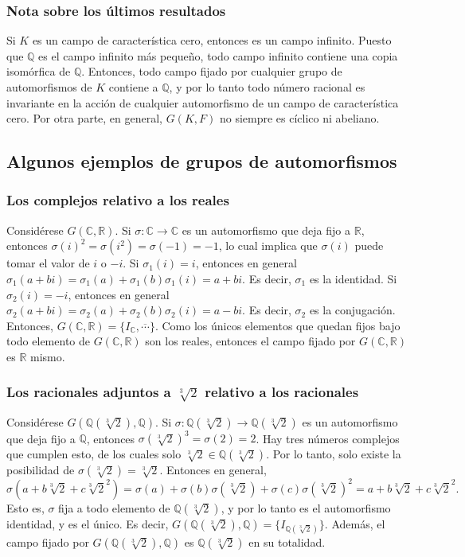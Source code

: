 \documentclass{article}
\begin{document}
\subsubsection*{\color{teal} Nota sobre los últimos resultados}

Si $K$ es un campo de característica cero, entonces es un campo infinito. Puesto que $\mathbb{Q}$ es el campo infinito más pequeño, todo campo infinito contiene una copia isomórfica de $\mathbb{Q}$. Entonces, todo campo fijado por cualquier grupo de automorfismos de $K$ contiene a $\mathbb{Q}$, y por lo tanto todo número racional es invariante en la acción de cualquier automorfismo de un campo de característica cero. Por otra parte, en general, $G(K,F)$ no siempre es cíclico ni abeliano. 

\subsection*{\color{teal} Algunos ejemplos de grupos de automorfismos}

\subsubsection*{\color{teal} Los complejos relativo a los reales}

Considérese $G(\mathbb{C},\mathbb{R})$. Si $\sigma:\mathbb{C}\to\mathbb{C}$ es un automorfismo que deja fijo a $\mathbb{R}$, entonces $\sigma(i)^2=\sigma(i^2)=\sigma(-1)=-1$, lo cual implica que $\sigma(i)$ puede tomar el valor de $i$ o $-i$. Si $\sigma_1(i)=i$, entonces en general $\sigma_1(a+bi)=\sigma_1(a)+\sigma_1(b)\sigma_1(i)=a+bi$. Es decir, $\sigma_1$ es la identidad. Si $\sigma_2(i)=-i$, entonces en general $\sigma_2(a+bi)=\sigma_2(a)+\sigma_2(b)\sigma_2(i)=a-bi$. Es decir, $\sigma_2$ es la conjugación. Entonces, $G(\mathbb{C},\mathbb{R})=\{I_{\mathbb{C}},\overline{\cdots}\}$. Como los únicos elementos que quedan fijos bajo todo elemento de $G(\mathbb{C},\mathbb{R})$ son los reales, entonces el campo fijado por $G(\mathbb{C},\mathbb{R})$ es $\mathbb{R}$ mismo.

\subsubsection*{\color{teal} Los racionales adjuntos a $\sqrt[3]{2}$ relativo a los racionales}

Considérese $G(\mathbb{Q}(\sqrt[3]{2}),\mathbb{Q})$. Si $\sigma:\mathbb{Q}(\sqrt[3]{2})\to\mathbb{Q}(\sqrt[3]{2})$ es un automorfismo que deja fijo a $\mathbb{Q}$, entonces $\sigma(\sqrt[3]{2})^3=\sigma(2)=2$. Hay tres números complejos que cumplen esto, de los cuales solo $\sqrt[3]{2}\in\mathbb{Q}(\sqrt[3]{2})$. Por lo tanto, solo existe la posibilidad de $\sigma(\sqrt[3]{2})=\sqrt[3]{2}$. Entonces en general, 
$$\sigma(a+b\sqrt[3]{2}+c\sqrt[3]{2}^2)=\sigma(a)+\sigma(b)\sigma(\sqrt[3]{2})+\sigma(c)\sigma(\sqrt[3]{2})^2=a+b\sqrt[3]{2}+c\sqrt[3]{2}^2.$$
Esto es, $\sigma$ fija a todo elemento de $\mathbb{Q}(\sqrt[3]{2})$, y por lo tanto es el automorfismo identidad, y es el único. Es decir, $G(\mathbb{Q}(\sqrt[3]{2}),\mathbb{Q})=\{I_{\mathbb{Q}(\sqrt[3]{2})}\}$. Además, el campo fijado por $G(\mathbb{Q}(\sqrt[3]{2}),\mathbb{Q})$ es $\mathbb{Q}(\sqrt[3]{2})$ en su totalidad.
\end{document}
